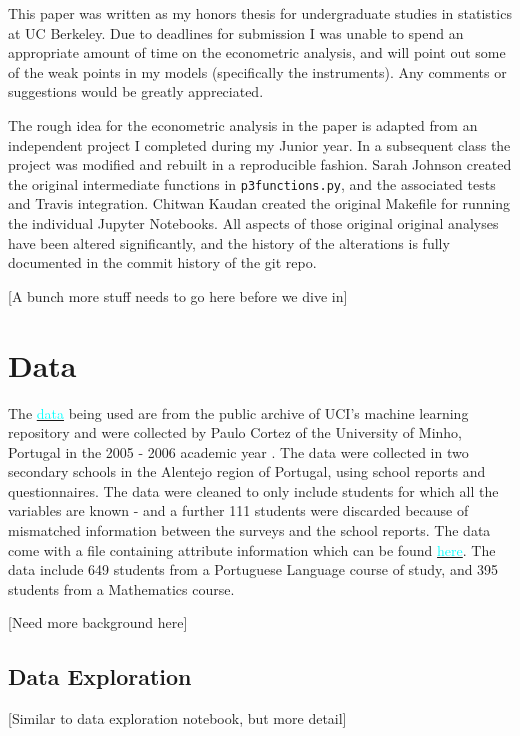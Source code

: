 \documentclass[12pt]{article}
\newcommand{\inlinecode}{\texttt}
\begin{document}
This paper was written as my honors thesis for undergraduate studies in statistics at UC Berkeley. Due to deadlines for submission I was unable to spend an appropriate amount of time on the econometric analysis, and will point out some of the weak points in my models (specifically the instruments). Any comments or suggestions would be greatly appreciated. 

The rough idea for the econometric analysis in the paper is adapted from an independent project I completed during my Junior year. In a subsequent class the project was modified and rebuilt in a reproducible fashion. Sarah Johnson created the original intermediate functions in \inlinecode{p3functions.py}, and the associated tests and Travis integration. Chitwan Kaudan created the original Makefile for running the individual Jupyter Notebooks. All aspects of those original original analyses have been altered significantly, and the history of the alterations is fully documented in the commit history of the git repo.

\textcolor{BrickRed}{[A bunch more stuff needs to go here before we dive in]}


\newpage
\section{Data}
The \href{https://archive.ics.uci.edu/ml/datasets/Student+Performance#}{\textcolor{cyan}{data}} being used are from the public archive of UCI's machine learning repository and were collected by Paulo Cortez of the University of Minho, Portugal in the 2005 - 2006 academic year \cite{data_paper}. The data were collected in two secondary schools in the Alentejo region of Portugal, using school reports and questionnaires. The data were cleaned to only include students for which all the variables are known - and a further 111 students were discarded because of mismatched information between the surveys and the school reports. The data come with a file containing attribute information which can be found \href{https://archive.ics.uci.edu/ml/datasets/Student+Performance#}{\textcolor{cyan}{here}}. The data include 649 students from a Portuguese Language course of study, and 395 students from a Mathematics course. 

\textcolor{BrickRed}{[Need more background here]}

\subsection{Data Exploration}
\textcolor{BrickRed}{[Similar to data exploration notebook, but more detail]}
\end{document}
